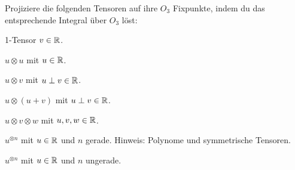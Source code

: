 \begin{sheet}
\begin{problem}[title={Tensoren auf $O_3$-Fixpunkte projizieren}]
	\label{aufg:TensorfixProj}
	Projiziere die folgenden Tensoren auf ihre $O_3$ Fixpunkte, indem du das entsprechende Integral über $O_3$ löst:
	\begin{subproblem}
		1-Tensor $v\in\mathbb{R}$.
	\end{subproblem}
	\begin{subproblem}
		$u\otimes u$ mit $u \in \mathbb{R}$.
	\end{subproblem}
	\begin{subproblem}
		$u\otimes v$ mit $u\perp v \in \mathbb{R}$.
	\end{subproblem}
	\begin{subproblem}
		$u\otimes (u+v)$ mit $u\perp v \in \mathbb{R}$.
	\end{subproblem}
	\begin{subproblem}
		$u\otimes v \otimes w$ mit $u,v,w \in \mathbb{R}$.
	\end{subproblem}
	\begin{subproblem}
		\label{aufg:TensorfixProjgeradeu}
		$u^{\otimes n}$ mit $u \in \mathbb{R}$ und $n$ gerade. Hinweis: Polynome und symmetrische Tensoren.
	\end{subproblem}
	\begin{subproblem}
		\label{aufg:TensorfixProjungeradeu}
		$u^{\otimes n}$ mit $u \in \mathbb{R}$ und $n$ ungerade.
	\end{subproblem}
\end{problem}
\end{sheet}
